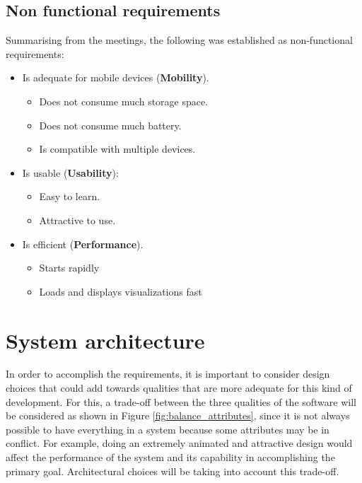 \subsection{Non functional requirements}

Summarising from the meetings, the following was established as non-functional requirements:

\begin{itemize}
    \item Is adequate for mobile devices (\textbf{Mobility}).
    \begin{itemize}
        \item Does not consume much storage space.
        \item Does not consume much battery.
        \item Is compatible with multiple devices.
    \end{itemize}
    \item Is usable (\textbf{Usability}):
    \begin{itemize}
        \item Easy to learn.
        \item Attractive to use.
    \end{itemize}
    \item Is efficient (\textbf{Performance}).
    \begin{itemize}
        \item Starts rapidly
        \item Loads and displays visualizations fast
    \end{itemize}
\end{itemize}


\section{System architecture}
In order to accomplish the requirements, it is important to consider design choices that could add towards qualities that are more adequate for this kind of development. For this, a trade-off between the three qualities of the software will be considered as shown in Figure \ref{fig:balance_attributes}, since it is not always possible to have everything in a system because some attributes may be in conflict. For example, doing an extremely animated and attractive design would affect the performance of the system and its capability in accomplishing the primary goal. Architectural choices will be taking into account this trade-off.


